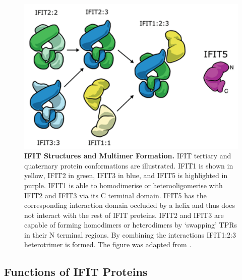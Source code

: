 \begin{figure}
    \centering
    \includegraphics[width=0.75\linewidth]{04. Introduction//Figs/05. IFIT-complexes.png}
    \caption[IFIT Structures and Multimer Formation.]{\textbf{IFIT Structures and Multimer Formation.} IFIT tertiary and quaternary protein conformations are illustrated. IFIT1 is shown in yellow, IFIT2 in green, IFIT3 in blue, and IFIT5 is highlighted in purple. IFIT1 is able to homodimerise or heterooligomerise with IFIT2 and IFIT3 via its C terminal domain. IFIT5 has the corresponding interaction domain occluded by a helix and thus does not interact with the rest of IFIT proteins. IFIT2 and IFIT3 are capable of forming homodimers or heterodimers by ‘swapping’ TPRs in their N terminal regions. By combining the interactions IFIT1:2:3 heterotrimer is formed. The figure was adapted from \cite{Mears2018BetterResponse}.}
    \label{fig:IFIT Structures and Multimer Formation.}
\end{figure}




\subsection{Functions of IFIT Proteins} \label{subsec:Functions of IFIT Proteins}
